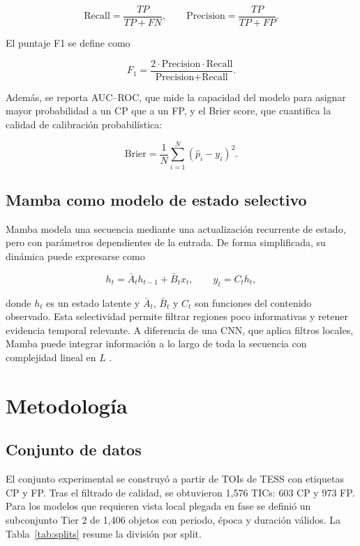 \documentclass[conference]{IEEEtran}
\newcommand{\aucroc}{AUC--ROC}
\begin{document}
\begin{equation}
\text{Recall}=\frac{TP}{TP+FN},\qquad
\text{Precision}=\frac{TP}{TP+FP}.
\end{equation}

El puntaje F1 se define como

\begin{equation}
F_1=\frac{2\cdot \text{Precision}\cdot \text{Recall}}{\text{Precision}+\text{Recall}}.
\end{equation}

Además, se reporta \aucroc{}, que mide la capacidad del modelo para asignar mayor probabilidad a un CP que a un FP, y el Brier score, que cuantifica la calidad de calibración probabilística:

\begin{equation}
\text{Brier}=\frac{1}{N}\sum_{i=1}^{N}(\hat{p}_i-y_i)^2.
\end{equation}

\subsection{Mamba como modelo de estado selectivo}

Mamba modela una secuencia mediante una actualización recurrente de estado, pero con parámetros dependientes de la entrada. De forma simplificada, su dinámica puede expresarse como

\begin{equation}
 h_t = \bar{A}_t h_{t-1}+\bar{B}_t x_t, \qquad y_t=C_t h_t,
\end{equation}

donde $h_t$ es un estado latente y $\bar{A}_t$, $\bar{B}_t$ y $C_t$ son funciones del contenido observado. Esta selectividad permite filtrar regiones poco informativas y retener evidencia temporal relevante. A diferencia de una CNN, que aplica filtros locales, Mamba puede integrar información a lo largo de toda la secuencia con complejidad lineal en $L$ \cite{gu2023mamba}.

\section{Metodología}

\subsection{Conjunto de datos}

El conjunto experimental se construyó a partir de TOIs de TESS con etiquetas CP y FP. Tras el filtrado de calidad, se obtuvieron 1,576 TICs: 603 CP y 973 FP. Para los modelos que requieren vista local plegada en fase se definió un subconjunto Tier 2 de 1,406 objetos con periodo, época y duración válidos. La Tabla~\ref{tab:splits} resume la división por split.
\end{document}
